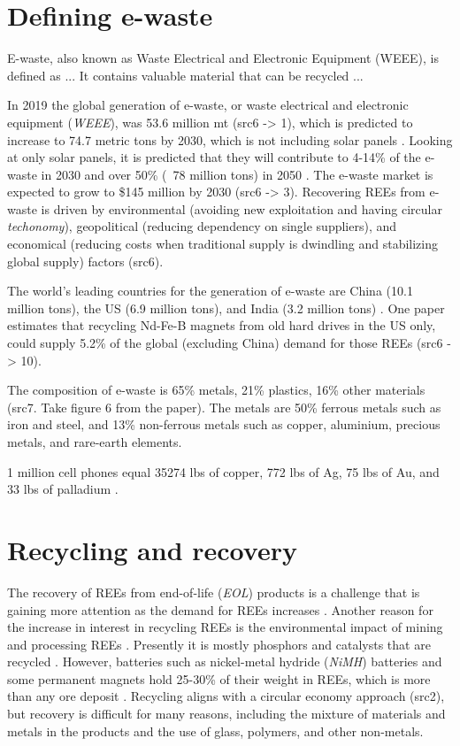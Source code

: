 
\section{Defining e-waste}

E-waste, also known as Waste Electrical and Electronic Equipment (WEEE), is defined as ... 
It contains valuable material that can be recycled ...

In 2019 the global generation of e-waste, or waste electrical and electronic equipment (\textit{WEEE}), was 53.6 million mt (src6 -> 1), which is predicted to increase to 74.7 metric tons by 2030, which is not including solar panels \cite{javed2024}. Looking at only solar panels, it is predicted that they will contribute to 4-14\% of the e-waste in 2030 and over 50\% (~78 million tons) in 2050 \cite{javed2024}. The e-waste market is expected to grow to \$145 million by 2030 (src6 -> 3). Recovering REEs from e-waste is driven by environmental (avoiding new exploitation and having circular \textit{techonomy}), geopolitical (reducing dependency on single suppliers), and economical (reducing costs when traditional supply is dwindling and stabilizing global supply) factors (src6).

The world's leading countries for the generation of e-waste are China (10.1 million tons), the US (6.9 million tons), and India (3.2 million tons) \cite{javed2024}. One paper estimates that recycling Nd-Fe-B magnets from old hard drives in the US only, could supply 5.2\% of the global (excluding China) demand for those REEs (src6 -> 10).

The composition of e-waste is 65\% metals, 21\% plastics, 16\% other materials (src7. Take figure 6 from the paper). The metals are 50\% ferrous metals such as iron and steel, and 13\% non-ferrous metals such as copper, aluminium, precious metals, and rare-earth elements. 

1 million cell phones equal 35274 lbs of copper, 772 lbs of Ag, 75 lbs of Au, and 33 lbs of palladium \cite{javed2024}.

\section{Recycling and recovery}

The recovery of REEs from end-of-life (\textit{EOL}) products is a challenge that is gaining more attention as the demand for REEs increases \cite{USDoE2024}. Another reason for the increase in interest in recycling REEs is the environmental impact of mining and processing REEs \cite{USDoE2024}. Presently it is mostly phosphors and catalysts that are recycled \cite{britannica2024}. However, batteries such as nickel-metal hydride (\textit{NiMH}) batteries and some permanent magnets hold 25-30\% of their weight in REEs, which is more than any ore deposit \cite{britannica2024}. Recycling aligns with a circular economy approach (src2), but recovery is difficult for many reasons, including the mixture of materials and metals in the products and the use of glass, polymers, and other non-metals.

